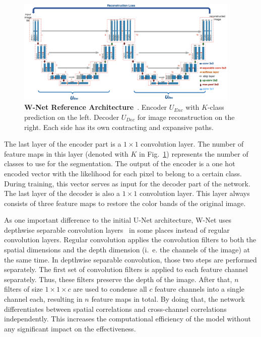 \begin{figure}[h]
    \centering
    \includegraphics[width=0.95\textwidth]{images/w-net-architecture}
    \caption[W-Net Reference Architecture]
    {\textbf{W-Net Reference Architecture}~\cite[modified]{wnet17}. Encoder $U_{Enc}$ with $K$-class prediction on the left. Decoder $U_{Dec}$ for image reconstruction on the right. Each side has its own contracting and expansive paths.}
    \label{fig:wnet_architecture}
\end{figure}

The last layer of the encoder part is a $1\times 1$ convolution layer. The number of feature maps in this layer (denoted with $K$ in Fig.~\ref{fig:wnet_architecture}) represents the number of classes to use for the segmentation. The output of the encoder is a one hot encoded vector with the likelihood for each pixel to belong to a certain class. During training, this vector serves as input for the decoder part of the network. The last layer of the decoder is also a $1\times 1$ convolution layer. This layer always consists of three feature maps to restore the color bands of the original image.

As one important difference to the initial U-Net architecture, W-Net uses depthwise separable convolution layers~\cite{depthwise_conv17} in some places instead of regular convolution layers. Regular convolution applies the convolution filters to both the spatial dimensions and the depth dimension (i.~e. the channels of the image) at the same time. In depthwise separable convolution, those two steps are performed separately. The first set of convolution filters is applied to each feature channel separately. Thus, these filters preserve the depth of the image. After that, $n$ filters of size $1\times 1\times c$ are used to condense all $c$ feature channels into a single channel each, resulting in $n$ feature maps in total. By doing that, the network differentiates between spatial correlations and cross-channel correlations independently. This increases the computational efficiency of the model without any significant impact on the effectiveness.

